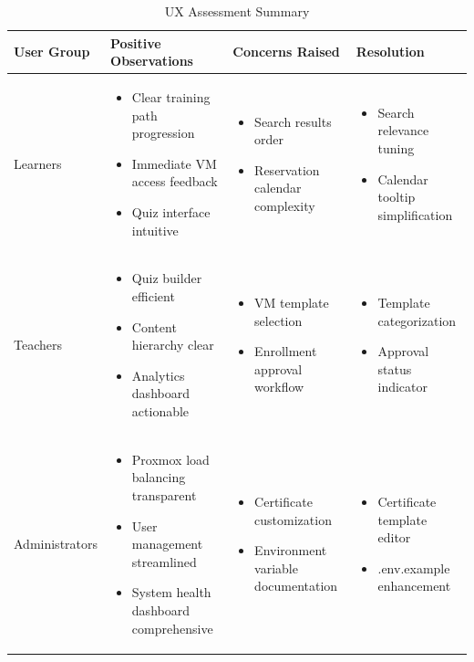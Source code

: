 \begin{table}[H]
\centering
\caption{UX Assessment Summary}
\label{tab:ux-assessment}
\begin{tabular}{|p{3.5cm}|p{3cm}|p{3cm}|p{4.5cm}|}
\hline
\textbf{User Group} & \textbf{Positive Observations} & \textbf{Concerns Raised} & \textbf{Resolution} \\
\hline
Learners & \begin{itemize}
\item Clear training path progression
\item Immediate VM access feedback
\item Quiz interface intuitive
\end{itemize} & \begin{itemize}
\item Search results order
\item Reservation calendar complexity
\end{itemize} & \begin{itemize}
\item Search relevance tuning
\item Calendar tooltip simplification
\end{itemize} \\
\hline
Teachers & \begin{itemize}
\item Quiz builder efficient
\item Content hierarchy clear
\item Analytics dashboard actionable
\end{itemize} & \begin{itemize}
\item VM template selection
\item Enrollment approval workflow
\end{itemize} & \begin{itemize}
\item Template categorization
\item Approval status indicator
\end{itemize} \\
\hline
Administrators & \begin{itemize}
\item Proxmox load balancing transparent
\item User management streamlined
\item System health dashboard comprehensive
\end{itemize} & \begin{itemize}
\item Certificate customization
\item Environment variable documentation
\end{itemize} & \begin{itemize}
\item Certificate template editor
\item .env.example enhancement
\end{itemize} \\
\hline
\end{tabular}
\end{table}

